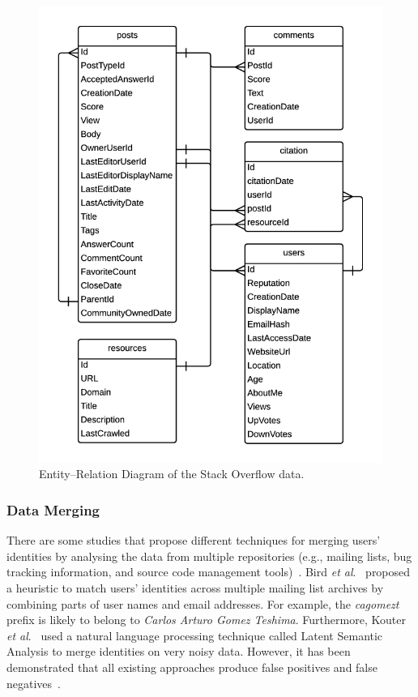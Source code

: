 \documentclass{sig-alternate-05-2015}
\begin{document}
	\begin{figure} [!ht]
		\centering
		\includegraphics[width=0.8\columnwidth]{Figures/SO-ERD}
		\caption{Entity--Relation Diagram of the Stack Overflow data.}
		\label{fig:SO-ERD}
	\end{figure}

\subsubsection*{Data Merging}
	There are some studies that propose different techniques for merging users' identities by analysing the data from multiple repositories (e.g., mailing lists, bug tracking information, and source code management tools)~\cite{Bird2006, Kouters2012,Vasilescu2014c}.
	Bird \textit{et al}.~\cite{Bird2006} proposed a heuristic to match users' identities across multiple mailing list archives by combining parts of user names and email addresses. For example, the \textit{cagomezt} prefix is likely to belong to \textit{Carlos Arturo Gomez Teshima}.
	Furthermore, Kouter \textit{et al}.~\cite{Kouters2012} used a natural language processing technique called Latent Semantic Analysis to merge identities on very noisy data.
	However, it has been demonstrated that all existing approaches produce false positives and false negatives~\cite{Goeminne2013}.
\end{document}
